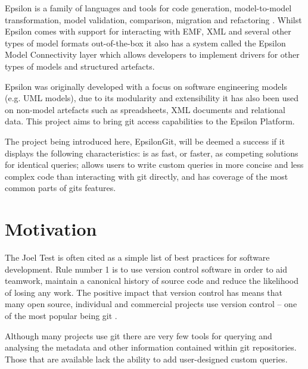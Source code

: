 \documentclass[11pt]{book}
\begin{document}
Epsilon is a family of languages and tools for code generation, model-to-model transformation, model validation, comparison, migration and refactoring \cite{epsilonhomepage}. Whilst Epsilon comes with support for interacting with EMF, XML and several other types of model formats out-of-the-box it also has a system called the Epsilon Model Connectivity layer which allows developers to implement drivers for other types of models and structured artefacts.

Epsilon was originally developed with a focus on software engineering models (e.g. UML models), due to its modularity and extensibility it has also been used on non-model artefacts such as spreadsheets, XML documents and relational data. This project aims to bring git access capabilities to the Epsilon Platform.

The project being introduced here, EpsilonGit, will be deemed a success if it displays the following characteristics: is as fast, or faster, as competing solutions for identical queries; allows users to write custom queries in more concise and less complex code than interacting with git directly, and has coverage of the most common parts of gits features.

\section{Motivation}
The Joel Test \cite{joeltest} is often cited as a simple list of best practices for software development. Rule number 1 is to use version control software in order to aid teamwork, maintain a canonical history of source code and reduce the likelihood of losing any work. The positive impact that version control has means that many open source, individual and commercial projects use version control -- one of the most popular being git \cite{gitpopularity}. 

Although many projects use git there are very few tools for querying and analysing the metadata and other information contained within git repositories. Those that are available lack the ability to add user-designed custom queries. 
\end{document}
